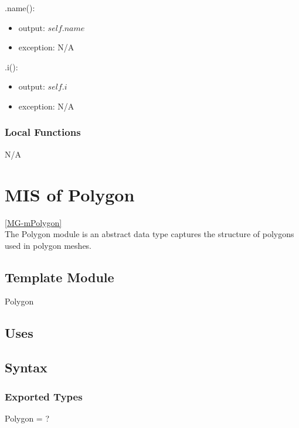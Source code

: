 \documentclass[12pt, titlepage]{article}
\begin{document}
\noindent .name():
\begin{itemize}
	\item output: $self.name$
	\item exception: N/A
\end{itemize}

\noindent .i():
\begin{itemize}
	\item output: $self.i$
	\item exception: N/A
\end{itemize}

\subsubsection{Local Functions}
N/A

\newpage

\section{MIS of Polygon} \ref{MG-mPolygon} \\
The Polygon module is an abstract data type captures the structure of polygons 
used in polygon meshes.

\subsection{Template Module}
Polygon

\subsection{Uses}

\subsection{Syntax}
\subsubsection{Exported Types}
Polygon = ?
\end{document}
